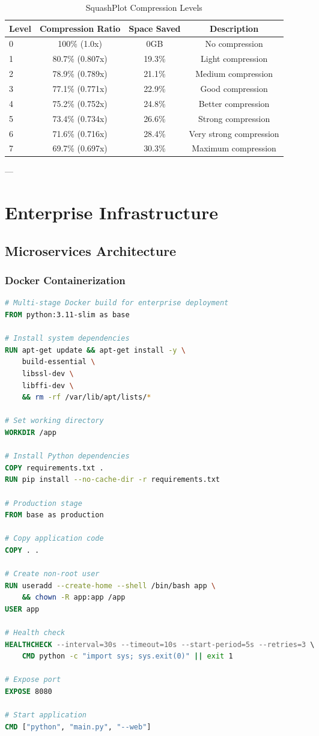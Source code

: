 \documentclass[11pt,a4paper]{article}
\begin{document}
\begin{table}[H]
\centering
\caption{SquashPlot Compression Levels}
\begin{tabular}{@{}lccc@{}}
\toprule
Level & Compression Ratio & Space Saved & Description \\
\midrule
0 & 100\% (1.0x) & 0GB & No compression \\
1 & 80.7\% (0.807x) & 19.3\% & Light compression \\
2 & 78.9\% (0.789x) & 21.1\% & Medium compression \\
3 & 77.1\% (0.771x) & 22.9\% & Good compression \\
4 & 75.2\% (0.752x) & 24.8\% & Better compression \\
5 & 73.4\% (0.734x) & 26.6\% & Strong compression \\
6 & 71.6\% (0.716x) & 28.4\% & Very strong compression \\
7 & 69.7\% (0.697x) & 30.3\% & Maximum compression \\
\bottomrule
\end{tabular}
\end{table}

---

\section{Enterprise Infrastructure}

\subsection{Microservices Architecture}

\subsubsection{Docker Containerization}

\begin{lstlisting}[language=Dockerfile, caption=SquashPlot Docker Configuration]
# Multi-stage Docker build for enterprise deployment
FROM python:3.11-slim as base

# Install system dependencies
RUN apt-get update && apt-get install -y \
    build-essential \
    libssl-dev \
    libffi-dev \
    && rm -rf /var/lib/apt/lists/*

# Set working directory
WORKDIR /app

# Install Python dependencies
COPY requirements.txt .
RUN pip install --no-cache-dir -r requirements.txt

# Production stage
FROM base as production

# Copy application code
COPY . .

# Create non-root user
RUN useradd --create-home --shell /bin/bash app \
    && chown -R app:app /app
USER app

# Health check
HEALTHCHECK --interval=30s --timeout=10s --start-period=5s --retries=3 \
    CMD python -c "import sys; sys.exit(0)" || exit 1

# Expose port
EXPOSE 8080

# Start application
CMD ["python", "main.py", "--web"]
\end{lstlisting}
\end{document}
